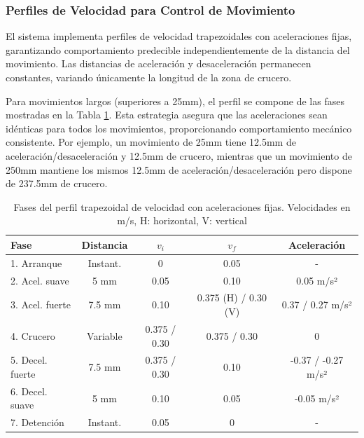 \subsubsection{Perfiles de Velocidad para Control de Movimiento}

El sistema implementa perfiles de velocidad trapezoidales con aceleraciones fijas, garantizando comportamiento predecible independientemente de la distancia del movimiento. Las distancias de aceleración y desaceleración permanecen constantes, variando únicamente la longitud de la zona de crucero.

Para movimientos largos (superiores a 25mm), el perfil se compone de las fases mostradas en la Tabla \ref{tab:perfil_trapezoidal}. Esta estrategia asegura que las aceleraciones sean idénticas para todos los movimientos, proporcionando comportamiento mecánico consistente. Por ejemplo, un movimiento de 25mm tiene 12.5mm de aceleración/desaceleración y 12.5mm de crucero, mientras que un movimiento de 250mm mantiene los mismos 12.5mm de aceleración/desaceleración pero dispone de 237.5mm de crucero.

\begin{table}[H]
\centering
\small
\begin{tabular}{|l|c|c|c|c|}
\hline
\textbf{Fase} & \textbf{Distancia} & \textbf{$v_i$} & \textbf{$v_f$} & \textbf{Aceleración} \\
\hline
1. Arranque & Instant. & 0 & 0.05 & - \\
\hline
2. Acel. suave & 5 mm & 0.05 & 0.10 & 0.05 m/s² \\
\hline
3. Acel. fuerte & 7.5 mm & 0.10 & 0.375 (H) / 0.30 (V) & 0.37 / 0.27 m/s² \\
\hline
4. Crucero & Variable & 0.375 / 0.30 & 0.375 / 0.30 & 0 \\
\hline
5. Decel. fuerte & 7.5 mm & 0.375 / 0.30 & 0.10 & -0.37 / -0.27 m/s² \\
\hline
6. Decel. suave & 5 mm & 0.10 & 0.05 & -0.05 m/s² \\
\hline
7. Detención & Instant. & 0.05 & 0 & - \\
\hline
\end{tabular}
\caption{Fases del perfil trapezoidal de velocidad con aceleraciones fijas. Velocidades en m/s, H: horizontal, V: vertical}
\label{tab:perfil_trapezoidal}
\end{table}

